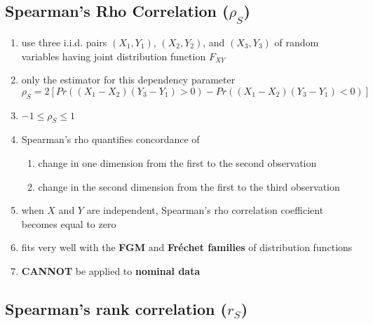\subsection{Spearman’s Rho Correlation ($\rho_S$) \cite{ism-1}} \label{Multivariate Distributions: Spearman’s Rho Correlation}

\begin{enumerate}
    \item use three i.i.d. pairs $(X_1, Y_1)$, $(X_2, Y_2)$, and $(X_3, Y_3)$ of random variables having joint distribution function $F_{XY}$

    \item only the estimator for this dependency parameter
    \[
        \rho_S = 2[Pr((X_1 - X_2)(Y_3 - Y_1) > 0) - Pr((X_1 - X_2)(Y_3 - Y_1) < 0)]
    \]

    \item[] $-1 \leq \rho_S \leq 1$
    
    \item Spearman’s rho quantifies concordance of 
    \begin{enumerate}
        \item change in one dimension from the first to the second observation

        \item change in the second dimension from the first to the third observation
    \end{enumerate}
    
    \item when $X$ and $Y$ are independent, Spearman’s rho correlation coefficient becomes equal to zero
    
    \item fits very well with the \textbf{FGM} and \textbf{Fréchet families} of distribution functions
    
    \item \textbf{CANNOT} be applied to \textbf{nominal data}
\end{enumerate}

\subsection{Spearman’s rank correlation ($r_S$) \cite{ism-1}} \label{Multivariate Distributions: Spearman’s rank correlation}


